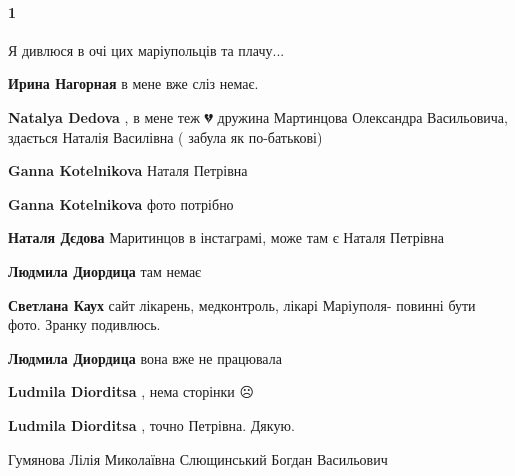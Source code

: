  
 
 
 
 

\paragraph{1}

\raggedcolumns
\begin{multicols}{2} %
\setlength{\parindent}{0pt}

\begin{itemize} %

Я дивлюся в очі цих маріупольців та плачу...

\begin{itemize} %
\textbf{Ирина Нагорная} в мене вже сліз немає.

\textbf{Natalya Dedova} , в мене теж 💔 дружина Мартинцова Олександра Васильовича, здається Наталія Василівна ( забула як по-батькові)

\textbf{Ganna Kotelnikova} Наталя Петрівна

\textbf{Ganna Kotelnikova} фото потрібно

\textbf{Наталя Дєдова} Маритинцов в інстаграмі, може там є Наталя Петрівна

\textbf{Людмила Диордица} там немає

\textbf{Светлана Каух} сайт лікарень, медконтроль, лікарі Маріуполя- повинні бути фото. Зранку подивлюсь.

\textbf{Людмила Диордица} вона вже не працювала

\textbf{Ludmila Diorditsa} , нема сторінки ☹️

\textbf{Ludmila Diorditsa} , точно Петрівна. Дякую.
\end{itemize} %

Гумянова Лілія Миколаївна
Слющинський Богдан Васильович

\begin{itemize} %


\end{itemize}
\end{itemize}
\end{multicols}
